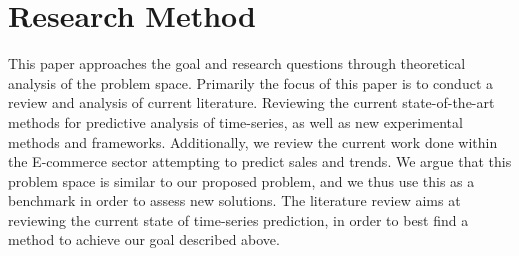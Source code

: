 \section{Research Method}
\label{section:Introduction:research-method}

This paper approaches the goal and research questions through theoretical analysis
of the problem space.
Primarily the focus of this paper is to conduct a review and analysis of current literature.
Reviewing the current state-of-the-art methods for predictive analysis of time-series,
as well as new experimental methods and frameworks.
Additionally, we review the current work done within the E-commerce sector attempting to predict sales and trends.
We argue that this problem space is similar to our proposed problem, and we thus use this as a benchmark in order to assess new solutions.
The literature review aims at reviewing the current state of time-series prediction,
in order to best find a method to achieve our goal described above.



\iffalse
  What methodology will you apply to address the goals: theoretic/analytic, model/abstraction or design/experiment?
  This section will describe the research methodology applied and the reason for this choice of research methodology.

\fi
